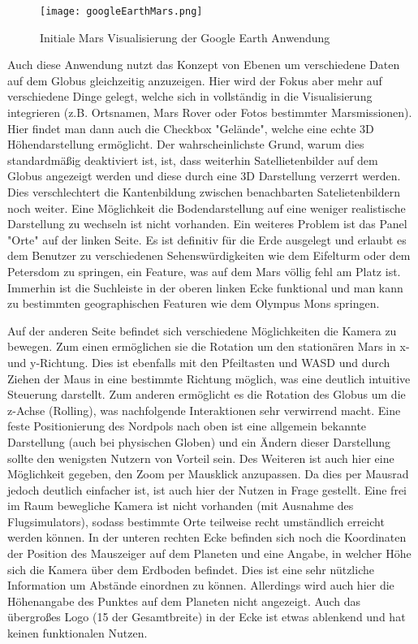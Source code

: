 \begin{figure}[H]
  \texttt{[image: googleEarthMars.png]}
  \caption{Initiale Mars Visualisierung der Google Earth Anwendung}
  \label{googleEarthMars}
\end{figure}

Auch diese Anwendung nutzt das Konzept von Ebenen um verschiedene Daten auf dem Globus gleichzeitig anzuzeigen. Hier wird der Fokus aber mehr auf verschiedene Dinge gelegt, welche sich in vollständig in die Visualisierung integrieren (z.B. Ortsnamen, Mars Rover oder Fotos bestimmter Marsmissionen). Hier findet man dann auch die Checkbox "Gelände", welche eine echte 3D Höhendarstellung ermöglicht. Der wahrscheinlichste Grund, warum dies standardmäßig deaktiviert ist, ist, dass weiterhin Satellietenbilder auf dem Globus angezeigt werden und diese durch eine 3D Darstellung verzerrt werden. Dies verschlechtert die Kantenbildung zwischen benachbarten Satelietenbildern noch weiter. Eine Möglichkeit die Bodendarstellung auf eine weniger realistische Darstellung zu wechseln ist nicht vorhanden. Ein weiteres Problem ist das Panel "Orte" auf der linken Seite. Es ist definitiv für die Erde ausgelegt und erlaubt es dem Benutzer zu verschiedenen Sehenswürdigkeiten wie dem Eifelturm oder dem Petersdom zu springen, ein Feature, was auf dem Mars völlig fehl am Platz ist. Immerhin ist die Suchleiste in der oberen linken Ecke funktional und man kann zu bestimmten geographischen Featuren wie dem Olympus Mons springen.

Auf der anderen Seite befindet sich verschiedene Möglichkeiten die Kamera zu bewegen. Zum einen ermöglichen sie die Rotation um den stationären Mars in x- und y-Richtung. Dies ist ebenfalls mit den Pfeiltasten und WASD und durch Ziehen der Maus in eine bestimmte Richtung möglich, was eine deutlich intuitive Steuerung darstellt. Zum anderen ermöglicht es die Rotation des Globus um die z-Achse (Rolling), was nachfolgende Interaktionen sehr verwirrend macht. Eine feste Positionierung des Nordpols nach oben ist eine allgemein bekannte Darstellung (auch bei physischen Globen) und ein Ändern dieser Darstellung sollte den wenigsten Nutzern von Vorteil sein. Des Weiteren ist auch hier eine Möglichkeit gegeben, den Zoom per Mausklick anzupassen. Da dies per Mausrad jedoch deutlich einfacher ist, ist auch hier der Nutzen in Frage gestellt. Eine frei im Raum bewegliche Kamera ist nicht vorhanden (mit Ausnahme des Flugsimulators), sodass bestimmte Orte teilweise recht umständlich erreicht werden können. In der unteren rechten Ecke befinden sich noch die Koordinaten der Position des Mauszeiger auf dem Planeten und eine Angabe, in welcher Höhe sich die Kamera über dem Erdboden befindet. Dies ist eine sehr nützliche Information um Abstände einordnen zu können. Allerdings wird auch hier die Höhenangabe des Punktes auf dem Planeten nicht angezeigt. Auch das übergroßes Logo (1\/5 der Gesamtbreite) in der Ecke ist etwas ablenkend und hat keinen funktionalen Nutzen.

